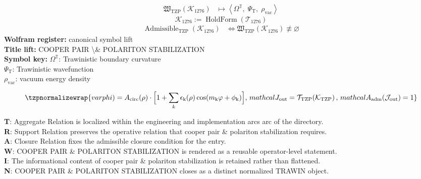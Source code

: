 \noindent
\begin{minipage}[t]{0.48\linewidth}
\begingroup
\small
\[
\begin{aligned}
\mathfrak{W}_{\mathrm{TZP}}\!\left(\mathcal{K}_{1276}\right)
&\longmapsto
\left\langle \Omega^{\mathbb{T}},\; \Psi_{\mathrm{T}},\; \rho_{\mathrm{vac}} \right\rangle
\end{aligned}
\]
\[
\mathcal{K}_{1276}
:=
\operatorname{HoldForm}\!\left(\mathcal{T}_{1276}\right)
\]
\[
\begin{aligned}
\operatorname{Admissible}_{\mathrm{TZP}}\!\left(\mathcal{K}_{1276}\right)
&\Longleftrightarrow
\mathfrak{W}_{\mathrm{TZP}}\!\left(\mathcal{K}_{1276}\right)\not\equiv\varnothing
\end{aligned}
\]
\textbf{Wolfram register:} canonical symbol lift\\
\textbf{Title lift:} COOPER PAIR \textbackslash{}\& POLARITON STABILIZATION\\
\textbf{Symbol key:} \(\Omega^{\mathbb{T}}\): Trawinistic boundary curvature\\ \(\Psi_{\mathrm{T}}\): Trawinistic wavefunction\\ \(\rho_{\mathrm{vac}}\): vacuum energy density
\par
\endgroup
\end{minipage}\hfill
\begin{minipage}[t]{0.48\linewidth}
\[
\tzpnormalizewrap{varphi) = A_{\text{circ}}(\rho) \cdot \Big[1 + \sum_{k} \epsilon_{\mathrm{k}}(\rho)\cos(m_{\mathrm{k}}\varphi + \phi_{\mathrm{k}})\Big],\,mathcal{J}_{\mathrm{out}} = \mathcal{T}_{\mathrm{TZP}}\!\left(\mathcal{K}_{\mathrm{TZP}}\right),\,mathcal{A}_{\mathrm{adm}}\!\left(\mathcal{J}_{\mathrm{out}}\right)=1}
\]

\small
\textbf{T}: Aggregate Relation is localized within the engineering and implementation arcs arc of the directory.\\
\textbf{R}: Support Relation preserves the operative relation that cooper pair \& polariton stabilization requires.\\
\textbf{A}: Closure Relation fixes the admissible closure condition for the entry.\\
\textbf{W}: COOPER PAIR \& POLARITON STABILIZATION is rendered as a reusable operator-level statement.\\
\textbf{I}: The informational content of cooper pair \& polariton stabilization is retained rather than flattened.\\
\textbf{N}: COOPER PAIR \& POLARITON STABILIZATION closes as a distinct normalized TRAWIN object.
\normalsize
\end{minipage}

